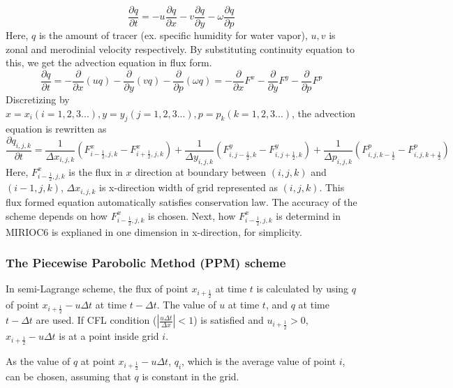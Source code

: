 \documentclass{article}
\begin{document}
\begin{equation}
\frac{\partial q}{\partial t} = -u \frac{\partial q}{\partial x}-v \frac{\partial q}{\partial y}-\omega \frac{\partial q}{\partial p}
\end{equation}
Here, $q$ is the amount of tracer (ex. specific humidity for water vapor), $u,v$ is zonal and merodinial velocity respectively.
By substituting continuity equation to this, we get the advection equation in flux form.
\begin{equation}
  \frac{\partial q}{\partial t}=-\frac{\partial}{\partial x}(uq)-\frac{\partial}{\partial y}(vq)-\frac{\partial}{\partial p}(\omega q)
  =-\frac{\partial}{\partial x}F^{x}-\frac{\partial}{\partial y}F^{y}-\frac{\partial}{\partial p}F^{p}
\end{equation}
Discretizing by $x=x_{i} (i=1,2,3...), y=y_{j} (j=1,2,3...), p=p_{k} (k=1,2,3...)$, the advection equation is rewritten as
\begin{equation}
  \frac{\partial q_{i,j,k}}{\partial t}=\frac{1}{\Delta x_{i,j,k}}(F^{x}_{i-\frac{1}{2},j,k}-F^{x}_{i+\frac{1}{2},j,k})+\frac{1}{\Delta y_{i,j,k}}(F^{y}_{i,j-\frac{1}{2},k}-F^{y}_{i,j+\frac{1}{2},k})+\frac{1}{\Delta p_{i,j,k}}(F^{p}_{i,j,k-\frac{1}{2}}-F^{p}_{i,j,k+\frac{1}{2}})
\end{equation}
Here, $F^{x}_{i-\frac{1}{2},j,k}$ is the flux in $x$ direction at boundary between $(i,j,k)$ and $(i-1,j,k)$, $\Delta x_{i,j,k}$ is x-direction width of grid represented as $(i,j,k)$.
This flux formed equation automatically satisfies conservation law. 
The accuracy of the scheme depends on how $F^{x}_{i-\frac{1}{2},j,k}$ is chosen.
Next, how $F^{x}_{i-\frac{1}{2},j,k}$ is determind in MIRIOC6 is explianed in one dimension in x-direction, for simplicity. 
\subsubsection{The Piecewise Parobolic Method (PPM) scheme}
In semi-Lagrange scheme, the flux of point $x_{i+\frac{1}{2}}$ at time $t$ is calculated by using $q$ of point $x_{i+\frac{1}{2}}-u\Delta t$ at time $t-\Delta t$.
The value of $u$ at time $t$, and $q$ at time $t-\Delta t$ are used.
If CFL condition ($|\frac{u\Delta t}{\Delta x}|<1$) is satisfied and $u_{i+\frac{1}{2}}>0$, $x_{i+\frac{1}{2}}-u\Delta t$ is at a point inside grid $i$.

As the value of $q$ at point $x_{i+\frac{1}{2}}-u\Delta t$, $q_{i}$, which is the average value of point $i$, can be chosen, assuming that $q$ is constant in the grid. 
\end{document}
